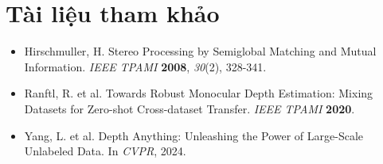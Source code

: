 \section*{Tài liệu tham khảo}
\begin{itemize}
    \item[1] Hirschmuller, H. Stereo Processing by Semiglobal Matching and Mutual Information. \textit{IEEE TPAMI} \textbf{2008}, \textit{30}(2), 328-341.
    \item[2] Ranftl, R. et al. Towards Robust Monocular Depth Estimation: Mixing Datasets for Zero-shot Cross-dataset Transfer. \textit{IEEE TPAMI} \textbf{2020}.
    \item[3] Yang, L. et al. Depth Anything: Unleashing the Power of Large-Scale Unlabeled Data. In \textit{CVPR}, 2024.
\end{itemize}
